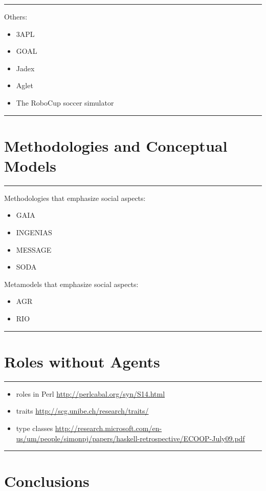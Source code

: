 \documentclass{article}
\newenvironment{notes}{\medskip\hrule\smallskip\narrower}{\smallskip\hrule\medskip}
\begin{document}
\begin{notes}
Others:
\begin{itemize}
\item 3APL~\cite{books/sp/map2005/DastaniRM05}
\item GOAL~\cite{hindriks2009programmingrationalagents}
\item Jadex~\cite{todo}
\item Aglet~\cite{todo}
\item The RoboCup soccer simulator
\end{itemize}
\end{notes}

\section{Methodologies and Conceptual Models}\label{sec:general_nonsense} %

\begin{notes}
Methodologies that emphasize social aspects:
\begin{itemize}
\item GAIA~\cite{journals/aamas/WooldridgeJK00}
\item INGENIAS
\item MESSAGE
\item SODA
\end{itemize}
Metamodels that emphasize social aspects:
\begin{itemize}
\item AGR~\cite{conf/aose/FerberGM03}
\item RIO
\end{itemize}
\end{notes}

\section{Roles without Agents}\label{sec:other_roles} %

\begin{notes}
\begin{itemize}
\item roles in Perl \url{http://perlcabal.org/syn/S14.html}
\item traits \url{http://scg.unibe.ch/research/traits/}
\item type classes \url{http://research.microsoft.com/en-us/um/people/simonpj/papers/haskell-retrospective/ECOOP-July09.pdf}
\end{itemize}
\end{notes}

\section{Conclusions}\label{sec:conclusions} %



\end{document}
